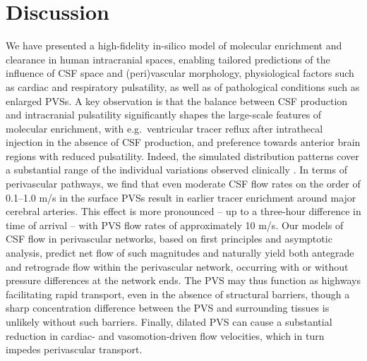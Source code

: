 \documentclass[fleqn,10pt]{wlscirep}
\begin{document}





\section*{Discussion}

We have presented a high-fidelity in-silico model of molecular
enrichment and clearance in human intracranial spaces, enabling
tailored predictions of the influence of CSF space and (peri)vascular
morphology, physiological factors such as cardiac and respiratory
pulsatility, as well as of pathological conditions such as enlarged
PVSs. A key observation is that the balance between CSF production and
intracranial pulsatility significantly shapes the large-scale features
of molecular enrichment, with e.g.~ventricular tracer reflux after
intrathecal injection in the absence of CSF production, and preference
towards anterior brain regions with reduced pulsatility. Indeed, the
simulated distribution patterns cover a substantial range of the
individual variations observed clinically \cite{ringstad2018brain}. In
terms of perivascular pathways, we find that even moderate CSF flow
rates on the order of 0.1--1.0 \textmu m/s in the surface PVSs result
in earlier tracer enrichment around major cerebral arteries. This
effect is more pronounced -- up to a three-hour difference in time of
arrival -- with PVS flow rates of approximately 10 \textmu m/s.  Our
models of CSF flow in perivascular networks, based on first principles
and asymptotic analysis, predict net flow of such magnitudes and
naturally yield both antegrade and retrograde flow within the
perivascular network, occurring with or without pressure differences
at the network ends. The PVS may thus function as highways
facilitating rapid transport, even in the absence of structural
barriers, though a sharp concentration difference between the PVS and
surrounding tissues is unlikely without such barriers. Finally,
dilated PVS can cause a substantial reduction in cardiac- and
vasomotion-driven flow velocities, which in turn impedes perivascular
transport.
\end{document}
